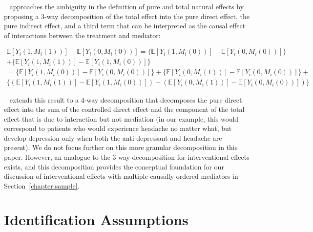 ~\cite{vanderweele2013} approaches the ambiguity in the definition of pure and total natural effects by proposing
a 3-way decomposition of the total effect into the pure direct effect, the pure indirect effect, and a third
term that can be interpreted as the causal effect of interactions between the treatment and mediator:

\begin{equation}
\begin{aligned}
	\mathbb{E}[Y_{i}(1,M_{i}(1))] - \mathbb{E}[Y_{i}(0,M_{i}(0))] = 
	\{\mathbb{E}[Y_{i}(1,M_{i}(0))] - \mathbb{E}[Y_{i}(0,M_{i}(0))]\}\\ 
	+ \{\mathbb{E}[Y_{i}(1,M_{i}(1))] - \mathbb{E}[Y_{i}(1,M_{i}(0))]\}\\
	= \{\mathbb{E}[Y_{i}(1,M_{i}(0))] - \mathbb{E}[Y_{i}(0,M_{i}(0))]\}
	+ \{\mathbb{E}[Y_{i}(0,M_{i}(1))] - \mathbb{E}[Y_{i}(0,M_{i}(0))]\} + \\
	\{(\mathbb{E}[Y_{i}(1,M_{i}(1))] - \mathbb{E}[Y_{i}(1,M_{i}(0))]) - 
	(\mathbb{E}[Y_{i}(0,M_{i}(1))] - \mathbb{E}[Y_{i}(0,M_{i}(0))])\}
\end{aligned}
\end{equation}


~\cite{vanderweele2014} extends this result to a 4-way decomposition that decomposes the pure direct effect into 
the sum of the controlled direct effect and the component of the total effect that is due to interaction but not 
mediation (in our example, this would correspond to patients who would experience headache no matter what, but 
develop depression only when both the anti-depressant and headache are present). We do not focus further on this 
more granular decomposition in this paper. However, an analogue to the 3-way decomposition for interventional
effects exists, and this decomposition provides the conceptual foundation for our discussion of interventional 
effects with multiple causally ordered mediators in Section~\ref{chapter:sample}. 

\section{Identification Assumptions}

